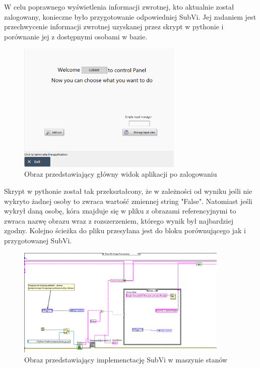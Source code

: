 \documentclass{report}
\begin{document}
W celu poprawnego wyświetlenia informacji zwrotnej, kto aktualnie został zalogowany, konieczne było przygotowanie odpowiedniej
SubVi. Jej zadaniem jest przechwycenie informacji zwrotnej uzyskanej przez skrypt w pythonie i porównanie jej z dostępnymi osobami w bazie. 

\begin{figure}[H]
    \centering
    \includegraphics[width=0.7\textwidth]{src/Logged.png}
    \caption{Obraz przedstawiający główny widok aplikacji po zalogowaniu}
    \label{fig:first-att}
\end{figure}

Skrypt w pythonie został tak przekształcony, że w zależności od wyniku jeśli nie wykryto żadnej osoby to zwraca wartość zmiennej string "False".
Natomiast jeśli wykrył daną osobę, kóra znajduje się w pliku z obrazami referencyjnymi to zwraca nazwę obrazu wraz z rozszerzeniem, którego wynik był najbardziej zgodny.
Kolejno ścieżka do pliku przesyłana jest do bloku porównującego jak i przygotowanej SubVi.

\begin{figure}[H]
    \centering
    \includegraphics[width=0.9\textwidth]{src/Database/Database_read.png}
    \caption{Obraz przedstawiający implemenctację SubVi w maszynie stanów}
    \label{fig:first-att}
\end{figure}
\end{document}
